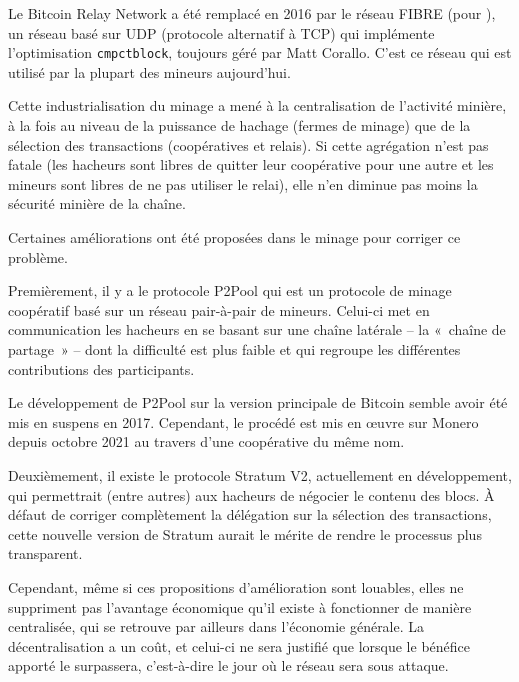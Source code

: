Le Bitcoin Relay Network a été remplacé en 2016 par le réseau FIBRE (pour ), un réseau basé sur UDP (protocole alternatif à TCP) qui implémente l'optimisation \texttt{cmpctblock}, toujours géré par Matt Corallo. C'est ce réseau qui est utilisé par la plupart des mineurs aujourd'hui.


Cette industrialisation du minage a mené à la centralisation de l'activité minière, à la fois au niveau de la puissance de hachage (fermes de minage) que de la sélection des transactions (coopératives et relais). Si cette agrégation n'est pas fatale (les hacheurs sont libres de quitter leur coopérative pour une autre et les mineurs sont libres de ne pas utiliser le relai), elle n'en diminue pas moins la sécurité minière de la chaîne.

Certaines améliorations ont été proposées dans le minage pour corriger ce problème.

Premièrement, il y a le protocole P2Pool qui est un protocole de minage coopératif basé sur un réseau pair-à-pair de mineurs. Celui-ci met en communication les hacheurs en se basant sur une chaîne latérale -- la «~chaîne de partage~» -- dont la difficulté est plus faible et qui regroupe les différentes contributions des participants.

Le développement de P2Pool sur la version principale de Bitcoin semble avoir été mis en suspens en 2017. Cependant, le procédé est mis en œuvre sur Monero depuis octobre 2021 au travers d'une coopérative du même nom.

Deuxièmement, il existe le protocole Stratum V2, actuellement en développement, qui permettrait (entre autres) aux hacheurs de négocier le contenu des blocs. À défaut de corriger complètement la délégation sur la sélection des transactions, cette nouvelle version de Stratum aurait le mérite de rendre le processus plus transparent.

Cependant, même si ces propositions d'amélioration sont louables, elles ne suppriment pas l'avantage économique qu'il existe à fonctionner de manière centralisée, qui se retrouve par ailleurs dans l'économie générale. La décentralisation a un coût, et celui-ci ne sera justifié que lorsque le bénéfice apporté le surpassera, c'est-à-dire le jour où le réseau sera sous attaque.

